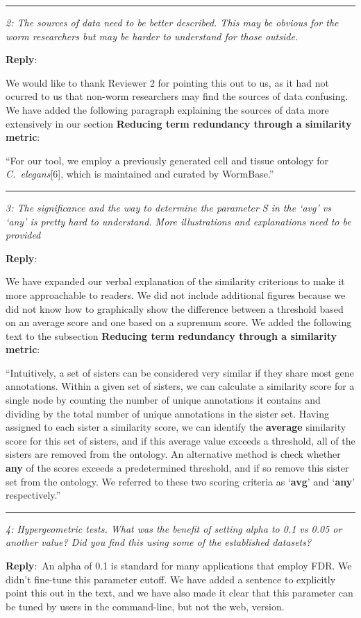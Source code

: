 \documentclass[12pt]{article}
\newcommand{\pointRaised}[2]{\medskip \hrule \noindent 
                \textsl{{\fontseries{b} #1}: #2}}
\newcommand{\reply}{\noindent \textbf{Reply}:\ }
\begin{document}
\pointRaised{2}{The sources of data need to be better described. This may be obvious for the worm researchers but may be harder to understand for those outside.}

\reply{We would like to thank Reviewer 2 for pointing this out to us, as it had not ocurred to us that non-worm researchers may find the sources of data confusing. We have added the following paragraph explaining the sources of data more extensively in our section \textbf{Reducing term redundancy through a similarity metric}:

``For our tool, we employ a previously generated cell and tissue ontology for \emph{C.~elegans}[6], which is maintained and curated by WormBase.''

}

\pointRaised{3}{The significance and the way to determine the parameter S in the `avg' vs `any' is pretty hard to understand. More illustrations and explanations need to be provided}

\reply{We have expanded our verbal explanation of the similarity criterions to make it more approachable to readers. We did not include additional figures because we did not know how to graphically show the difference between a threshold based on an average score and one based on a supremum score. We added the following text to the subsection \textbf{Reducing term redundancy through a similarity metric}:

``Intuitively, a set of sisters can be considered very similar if they share most gene annotations. Within a given set of sisters, we can calculate a similarity score for a single node by counting the number of unique annotations it contains and dividing by the total number of unique annotations in the sister set. Having assigned to each sister a similarity score, we can identify the \textbf{average} similarity score for this set of sisters, and if this average value exceeds a threshold, all of the sisters are removed from the ontology. An alternative method is check whether \textbf{any} of the scores exceeds a predetermined threshold, and if so remove this sister set from the ontology. We referred to these two scoring criteria as `\textbf{avg}' and `\textbf{any}' respectively.''

}

\pointRaised{4}{Hypergeometric tests. What was the benefit of setting alpha to 0.1 vs 0.05 or another value? Did you find this using some of the established datasets?}

\reply{An alpha of 0.1 is standard for many applications that employ FDR. We didn’t fine-tune this parameter cutoff. We have added a sentence to explicitly point this out in the text, and we have also made it clear that this parameter can be tuned by users in the command-line, but not the web, version.}
\end{document}
